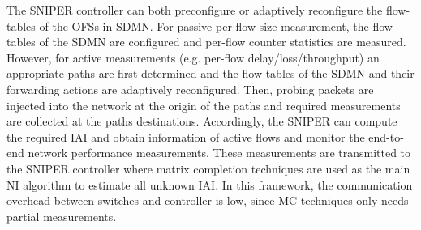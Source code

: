 The SNIPER controller can both preconfigure or adaptively reconfigure the flow-tables of the OFSs in SDMN. For passive per-flow size measurement, the flow-tables of the SDMN are configured and per-flow counter statistics are measured. However, for active measurements (e.g. per-flow delay/loss/throughput) an appropriate paths are first determined and the flow-tables of the SDMN and their forwarding actions are adaptively reconfigured. Then, probing packets are injected into the network at the origin of the paths and required measurements are collected at the paths destinations. Accordingly, the SNIPER can compute the required IAI and obtain information of active flows and monitor the end-to-end network performance measurements. These measurements are transmitted to the SNIPER controller where matrix completion techniques are used as the main NI algorithm to estimate all unknown IAI. In this framework, the communication overhead between switches and controller is low, since MC techniques only needs partial measurements. 

